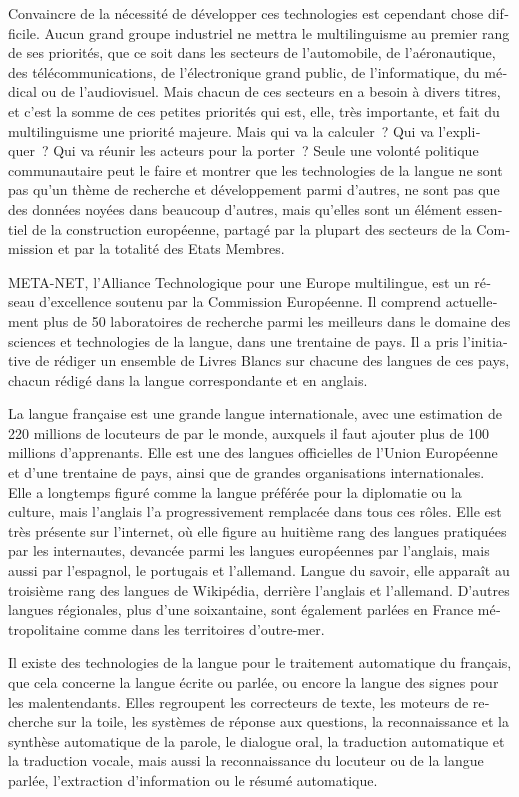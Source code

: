 \begin{french}
\begin{multicols}{2}
Convaincre de la nécessité de développer ces technologies est cependant chose difficile. Aucun grand groupe industriel ne mettra le multilinguisme au premier rang de ses priorités, que ce soit dans les secteurs de l’automobile, de l’aéronautique, des télécommunications, de l’électronique grand public, de l’informatique, du médical ou de l’audiovisuel. Mais chacun de ces secteurs en a besoin à divers titres, et c’est la somme de ces petites priorités qui est, elle, très importante, et fait du multilinguisme une priorité majeure. Mais qui va la calculer~? Qui va l’expliquer~? Qui va réunir les acteurs pour la porter~? Seule une volonté politique communautaire peut le faire et montrer que les technologies de la langue ne sont pas qu’un thème de recherche et développement parmi d’autres, ne sont pas que des données noyées dans beaucoup d’autres, mais qu’elles sont un élément essentiel de la construction européenne, partagé par la plupart des secteurs de la Commission et par la totalité des Etats Membres.

META-NET, l’Alliance Technologique pour une Europe multilingue, est un réseau d’excellence soutenu par la Commission Européenne. Il comprend actuellement plus de 50 laboratoires de recherche parmi les meilleurs dans le domaine des sciences et technologies de la langue, dans une trentaine de pays. Il a pris l’initiative de rédiger un ensemble de Livres Blancs sur chacune des langues de ces pays, chacun rédigé dans la langue correspondante et en anglais.

La langue française est une grande langue internationale, avec une estimation de 220 millions de locuteurs de par le monde, auxquels il faut ajouter plus de 100 millions d’apprenants. Elle est une des langues officielles de l’Union Européenne et d’une trentaine de pays, ainsi que de grandes organisations internationales. Elle a longtemps figuré comme la langue préférée pour la diplomatie ou la culture, mais l’anglais l’a progressivement remplacée dans tous ces rôles. Elle est très présente sur l’internet, où elle figure au huitième rang des langues pratiquées par les internautes, devancée parmi les langues européennes par l’anglais, mais aussi par l’espagnol, le portugais et l’allemand. Langue du savoir, elle apparaît au troisième rang des langues de Wikipédia, derrière l’anglais et l’allemand. D’autres langues régionales, plus d’une soixantaine, sont également parlées en France métropolitaine comme dans les territoires d’outre-mer.

Il existe des technologies de la langue pour le traitement automatique du français, que cela concerne la langue écrite ou parlée, ou encore la langue des signes pour les malentendants. Elles regroupent les correcteurs de texte, les moteurs de recherche sur la toile, les systèmes de réponse aux questions, la reconnaissance et la synthèse automatique de la parole, le dialogue oral, la traduction automatique et la traduction vocale, mais aussi la reconnaissance du locuteur ou de la langue parlée, l’extraction d’information ou le résumé automatique. 


\end{multicols}
\end{french}
